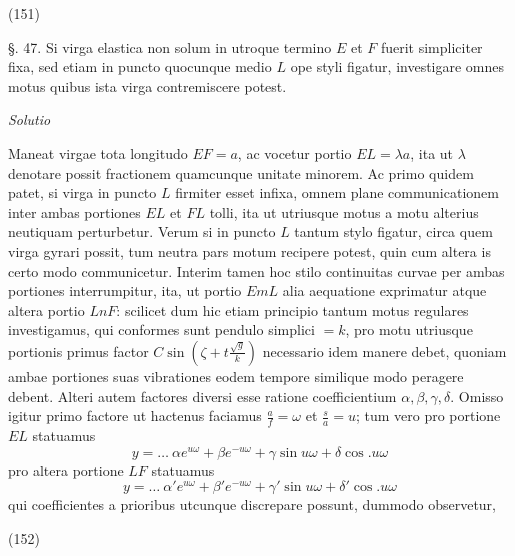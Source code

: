 \documentclass[11pt,a4paper]{article}
\begin{document}
(151)

§. 47. Si virga elastica non solum in utroque termino $E$ et $F$ fuerit simpliciter
fixa, sed etiam in puncto quocunque medio $L$ ope styli figatur, investigare
omnes motus quibus ista virga contremiscere potest.

\emph{Solutio}

Maneat virgae tota longitudo $EF=a$, ac vocetur portio $EL=\lambda a$, ita
ut $\lambda$ denotare possit fractionem quamcunque unitate minorem. Ac primo
quidem patet, si virga in puncto $L$ firmiter esset infixa, omnem
plane communicationem inter ambas portiones $EL$ et $FL$ tolli,
ita ut utriusque motus a motu alterius neutiquam perturbetur.
Verum si in puncto $L$ tantum stylo figatur, circa quem virga
gyrari possit, tum neutra pars motum recipere potest, quin cum altera
is certo modo communicetur. Interim tamen hoc stilo continuitas curvae
per ambas portiones interrumpitur, ita, ut portio $EmL$ alia aequatione
exprimatur atque altera portio $LnF$: scilicet dum hic etiam principio
tantum motus regulares investigamus, qui conformes sunt pendulo simplici $=k$,
pro motu utriusque portionis primus factor $C\sin(\zeta+t\frac{\surd g}{k})$ necessario idem manere
debet, quoniam ambae portiones suas vibrationes eodem tempore similique
modo peragere debent. Alteri autem factores diversi esse  ratione
coefficientium $\alpha, \beta, \gamma, \delta$. Omisso igitur primo factore ut hactenus faciamus
$\frac{a}{f}=\omega$ et $\frac{s}{a}=u$; tum vero pro portione $EL$ statuamus
\[ y=\ldots\ \alpha e^{u\omega}+\beta e^{-u\omega}+\gamma\sin u\omega+\delta\cos.u\omega \]
pro altera portione $LF$ statuamus
\[ y=\ldots\ \alpha' e^{u\omega}+\beta' e^{-u\omega}+\gamma'\sin u\omega+\delta'\cos.u\omega \]
qui coefficientes a prioribus utcunque discrepare possunt, dummodo observetur,

(152)
\end{document}
